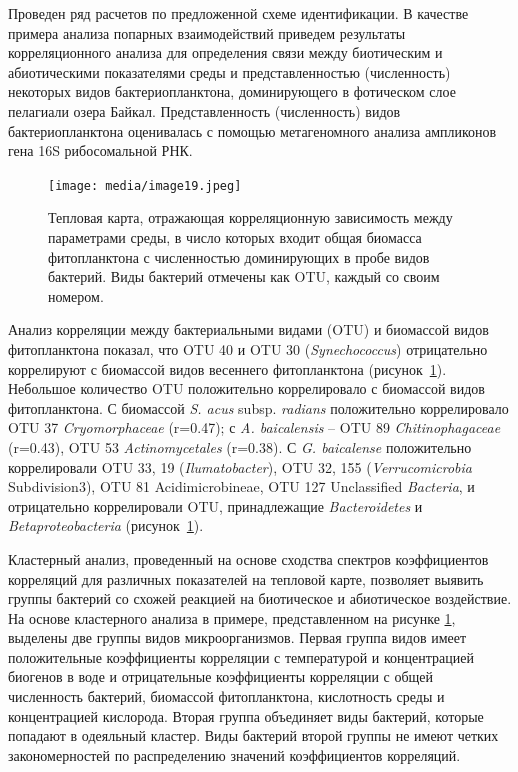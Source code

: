 \documentclass[a4paper,12pt,openany,final]{extreport}
\def\oldcaption{} \let\oldcaption=\caption
\def\caption{\stepcounter{captionsnum}\oldcaption}
\begin{document}
Проведен ряд расчетов по предложенной схеме идентификации. В качестве
примера анализа попарных взаимодействий приведем результаты
корреляционного анализа для определения связи между биотическим и
абиотическими показателями среды и представленностью (численность)
некоторых видов бактериопланктона, доминирующего в фотическом слое
пелагиали озера Байкал. Представленность (численность) видов
бактериопланктона оценивалась с помощью метагеномного анализа ампликонов
гена 16S рибосомальной РНК.

\begin{figure}\centering

\texttt{[image: media/image19.jpeg]}
\caption{Тепловая карта, отражающая корреляционную зависимость между
параметрами среды, в число которых входит общая биомасса фитопланктона с
численностью доминирующих в пробе видов бактерий. Виды бактерий отмечены
как OTU, каждый со своим номером.}\label{fig:heatmap-1}
\end{figure}

Анализ корреляции между бактериальными видами (OTU) и биомассой видов
фитопланктона показал, что OTU 40 и OTU 30 (\emph{Synechococcus})
отрицательно коррелируют с биомассой видов весеннего фитопланктона (рисунок~\ref{fig:heatmap-1}). Небольшое количество OTU положительно коррелировало с биомассой
видов фитопланктона. С биомассой \emph{S. acus} subsp. \emph{radians}
положительно коррелировало OTU 37 \emph{Cryomorphaceae} (r=0.47); с
\emph{A. baicalensis} -- OTU 89 \emph{Chitinophagaceae} (r=0.43), OTU 53
\emph{Actinomycetales} (r=0.38). С \emph{G. baicalense} положительно
коррелировали OTU 33, 19 (\emph{Ilumatobacter}), OTU 32, 155
(\emph{Verrucomicrobia} Subdivision3), OTU 81 Acidimicrobineae, OTU 127
Unclassified \emph{Bacteria}, и отрицательно коррелировали OTU,
принадлежащие \emph{Bacteroidetes} и \emph{Betaproteobacteria} (рисунок~\ref{fig:heatmap-1}).

Кластерный анализ, проведенный на основе сходства спектров коэффициентов корреляций для различных показателей на тепловой карте, позволяет выявить группы бактерий со схожей реакцией на биотическое и абиотическое воздействие. На основе кластерного анализа в примере, представленном на рисунке \ref{fig:heatmap-1}, выделены две группы видов микроорганизмов. Первая группа видов имеет положительные коэффициенты корреляции с температурой и концентрацией биогенов в воде и отрицательные коэффициенты корреляции с общей численность бактерий, биомассой фитопланктона, кислотность среды и концентрацией кислорода. Вторая группа объединяет виды бактерий, которые попадают в одеяльный кластер. Виды бактерий второй группы не имеют четких закономерностей по распределению значений коэффициентов корреляций.
\end{document}
